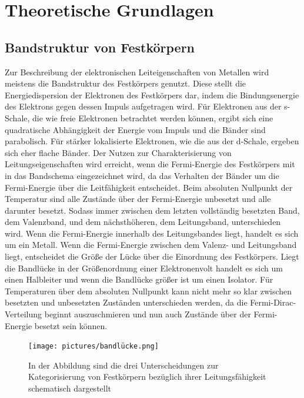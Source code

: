 \section{Theoretische Grundlagen}
    \subsection{Bandstruktur von Festkörpern}
        Zur Beschreibung der elektronischen Leiteigenschaften von Metallen wird meistens die Bandstruktur des Festkörpers genutzt. Diese stellt die Energiedispersion der Elektronen des Festkörpers dar, indem 
        die Bindungsenergie des Elektrons gegen dessen Impuls aufgetragen wird. Für Elektronen aus der s-Schale, die wie freie Elektronen betrachtet werden können, ergibt sich eine quadratische Abhängigkeit 
        der Energie vom Impuls und die Bänder sind parabolisch. Für stärker lokalisierte Elektronen, wie die aus der d-Schale, ergeben sich eher flache Bänder. Der Nutzen zur Charakterisierung von 
        Leitungseigenschaften wird erreicht, wenn die Fermi-Energie des Festkörpers mit in das Bandschema eingezeichnet wird, da das Verhalten der Bänder um die Fermi-Energie über die Leitfähigkeit
        entscheidet. Beim absoluten Nullpunkt der Temperatur sind alle Zustände über der Fermi-Energie unbesetzt und alle darunter besetzt. Sodass immer zwischen dem letzten vollständig besetzten Band, dem 
        Valenzband, und dem nächsthöheren, dem Leitungsband, unterschieden wird. Wenn die Fermi-Energie innerhalb des Leitungsbandes liegt, handelt es sich um ein Metall. Wenn die Fermi-Energie zwischen dem 
        Valenz- und Leitungsband liegt, entscheidet die Größe der Lücke über die Einordnung des Festkörpers. Liegt die Bandlücke in der Größenordnung einer Elektronenvolt handelt es sich um einen Halbleiter
        und wenn die Bandlücke größer ist um einen Isolator. Für Temperaturen über dem absoluten Nullpunkt kann nicht mehr so klar zwischen besetzten und unbesetzten Zuständen unterschieden werden, da die 
        Fermi-Dirac-Verteilung beginnt auszuschmieren und nun auch Zustände über der Fermi-Energie besetzt sein können.

        \FloatBarrier

        \begin{figure}[h]
          \centering
          \texttt{[image: pictures/bandlücke.png]}
          \caption{In der Abbildung sind die drei Unterscheidungen zur Kategorisierung von Festkörpern bezüglich ihrer Leitungsfähigkeit schematisch dargestellt}
          \label{fig:Bandlücken}
        \end{figure}

